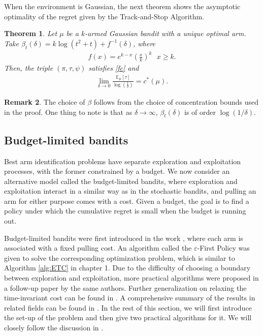 \documentclass[10pt,a4article]{article}
\numberwithin{equation}{section}
\theoremstyle{plain}
\newtheorem{Th}{Theorem}[section]
\theoremstyle{definition}
\newtheorem{Rem}[Th]{Remark}
\def\E{{\mathbb E}}
\def\e{{\varepsilon}}
\begin{document}
When the environment is Gaussian, the next theorem shows the asymptotic optimality of the regret given by the Track-and-Stop Algorithm. 

\begin{Th}
Let $\mu$ be a $k$-armed Gaussian bandit with a unique optimal arm. Take $\beta_t(\delta)=k\log (t^2+t)+f^{-1}(\delta)$, where
\begin{align*}
f(x)=e^{k-x}\left(\frac{x}{k}\right)^k\ \ \ x\geq k. 
\end{align*}
Then, the triple $(\pi, \tau, \psi)$ satisfies \eqref{fc} and 
\begin{align*}
\displaystyle\lim_{\delta\to 0}\frac{\E_\mu[\tau]}{\log\left(\frac{1}{\delta}\right)}=c^*(\mu). 
\end{align*}
\end{Th}
\begin{Rem}
The choice of $\beta$ follows from the choice of concentration bounds used in the proof. One thing to note is that as $\delta\to\infty$, $\beta_t(\delta)$ is of order $\log(1/\delta)$. 
\end{Rem}

\subsection{Budget-limited bandits}

Best arm identification problems have separate exploration and exploitation processes, with the former constrained by a budget.  We now consider an alternative model called the budget-limited bandits, where exploration and exploitation interact in a similar way as in the stochastic bandits, and pulling an arm for either purpose comes with a cost. Given a budget, the goal is to find a policy under which the cumulative regret is small when the budget is running out. 

Budget-limited bandits were first introduced in the work \cite{tran2010epsilon}, where each arm is associated with a fixed pulling cost. An algorithm called the $\e$-First Policy was given to solve the corresponding optimization problem, which is similar to Algorithm \ref{alg:ETC} in chapter 1. Due to the difficulty of choosing a boundary between exploration and exploitation, more practical algorithms were proposed in a follow-up paper \cite{tran2012knapsack} by the same authors. Further generalization on relaxing the time-invariant cost can be found in \cite{ding2013multi}. A comprehensive summary of the results in related fields can be found in \cite{zhou2018budget}. In the rest of this section, we will first introduce the set-up of the problem and then give two practical algorithms for it. We will closely follow the discussion in \cite{tran2012knapsack}. 
\end{document}

